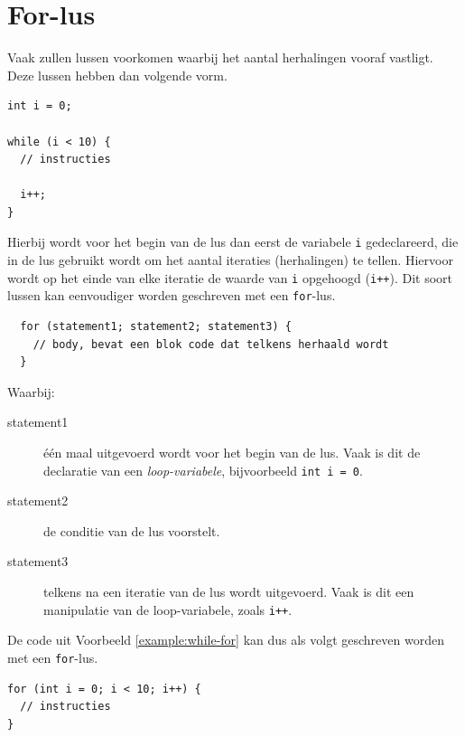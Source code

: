 \documentclass[11pt,fleqn]{book} %
\begin{document}
\section{For-lus}
Vaak zullen lussen voorkomen waarbij het aantal herhalingen vooraf vastligt. Deze lussen hebben dan volgende vorm.

\begin{example}
	\label{example:while-for}
	\phantom{ }
	\begin{verbatim}
int i = 0;

while (i < 10) {
  // instructies
  
  i++;
}
	\end{verbatim}
\end{example}
\noindent
Hierbij wordt voor het begin van de lus dan eerst de variabele \texttt{i} gedeclareerd, die in de lus gebruikt wordt om het aantal iteraties (herhalingen) te tellen. Hiervoor wordt op het einde van elke iteratie de waarde van \texttt{i} opgehoogd (\texttt{i++}). Dit soort lussen kan eenvoudiger worden geschreven met een \texttt{for}-lus.

\begin{definition}[For]
	\phantom{ }
	\begin{verbatim}
  for (statement1; statement2; statement3) {
    // body, bevat een blok code dat telkens herhaald wordt
  }
	\end{verbatim}
	Waarbij:
	\begin{description}
		\item[statement1] één maal uitgevoerd wordt voor het begin van de lus. Vaak is dit de declaratie van een \emph{loop-variabele}, bijvoorbeeld \texttt{int i = 0}.
		\item[statement2] de conditie van de lus voorstelt.
		\item[statement3] telkens na een iteratie van de lus wordt uitgevoerd. Vaak is dit een manipulatie van de loop-variabele, zoals \texttt{i++}.
	\end{description}
\end{definition}
\noindent
De code uit Voorbeeld \ref{example:while-for} kan dus als volgt geschreven worden met een \texttt{for}-lus.

\begin{example}
	\phantom{ }
	\begin{verbatim}
for (int i = 0; i < 10; i++) {
  // instructies
}
	\end{verbatim}
\end{example}
\end{document}
